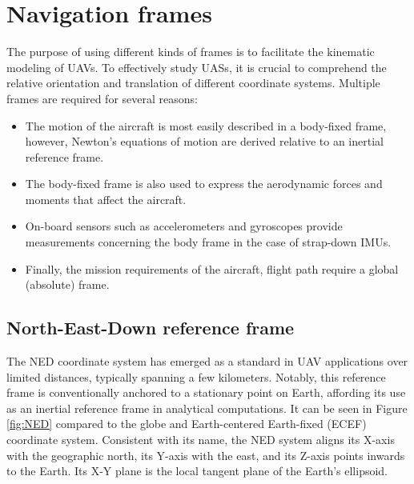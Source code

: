 \section{Navigation frames}

 The purpose of using different kinds of frames is to facilitate the kinematic modeling of UAVs. To effectively study UASs, it is crucial to comprehend the relative orientation and translation of different coordinate systems. Multiple frames are required for several reasons:
\begin{itemize}
    \item 
    The motion of the aircraft is most easily described in a body-fixed frame, however, Newton's equations of motion are derived relative to an inertial reference frame.
    \item 
    The body-fixed frame is also used to express the aerodynamic forces and moments that affect the aircraft.
    \item
    On-board sensors such as accelerometers and gyroscopes provide measurements concerning the body frame in the case of strap-down IMUs.
    \item 
    Finally, the mission requirements of the aircraft, \eg flight path require a global (absolute) frame.
\end{itemize}

\subsection{North-East-Down reference frame}

The NED coordinate system has emerged as a standard in UAV applications over limited distances, typically spanning a few kilometers. Notably, this reference frame is conventionally anchored to a stationary point on Earth, affording its use as an inertial reference frame in analytical computations. It can be seen in Figure \ref{fig:NED} compared to the globe and Earth-centered Earth-fixed (ECEF) coordinate system. Consistent with its name, the NED system aligns its X-axis with the geographic north, its Y-axis with the east, and its Z-axis points inwards to the Earth. Its X-Y plane is the local tangent plane of the Earth's ellipsoid.

